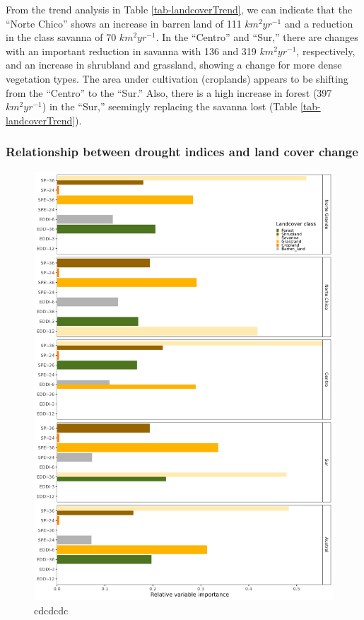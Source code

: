 \documentclass[
  authoryear,
  preprint,
  3p,
  onecolumn]{elsarticle}
\begin{document}
From the trend analysis in Table \ref{tab-landcoverTrend}, we can
indicate that the ``Norte Chico'' shows an increase in barren land of
111 \(km^2 yr^{-1}\) and a reduction in the class savanna of 70
\(km^2 yr^{-1}\). In the ``Centro'' and ``Sur,'' there are changes with
an important reduction in savanna with 136 and 319 \(km^2 yr^{-1}\),
respectively, and an increase in shrubland and grassland, showing a
change for more dense vegetation types. The area under cultivation
(croplands) appears to be shifting from the ``Centro'' to the ``Sur.''
Also, there is a high increase in forest (397 \(km^2 yr^{-1}\)) in the
``Sur,'' seemingly replacing the savanna lost (Table
\ref{tab-landcoverTrend}).

\hypertarget{relationship-between-drought-indices-and-land-cover-change}{%
\subsubsection{Relationship between drought indices and land cover
change}\label{relationship-between-drought-indices-and-land-cover-change}}

\begin{figure}[!ht]

{\centering \includegraphics{../output/figs/bars_relative_importance_RF.png}

}

\caption{\label{fig-varImportance}cdcdcdc}

\end{figure}
\end{document}
